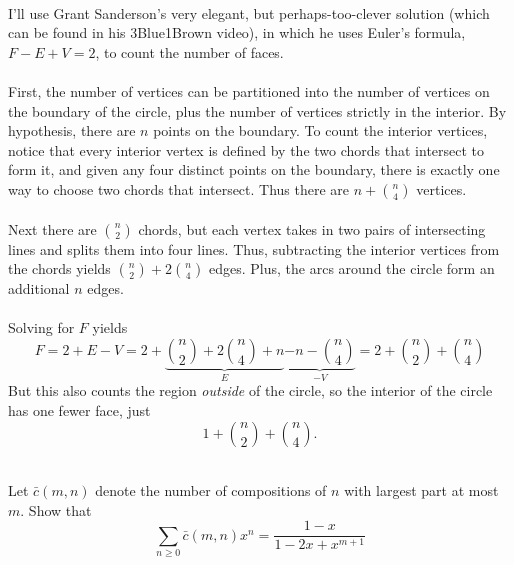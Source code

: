 \documentclass{article}
\newenvironment{problem}[2][Problem]{\begin{trivlist}
\item[\hskip \labelsep {\bfseries #1}\hskip \labelsep {\bfseries #2.}]}{\end{trivlist}}
\newenvironment{solution}[1][Solution.]{\begin{trivlist}
\item[\hskip \labelsep {\bfseries #1}]}{\end{trivlist}}
\begin{document}
\begin{solution} \text{} \\
  I'll use Grant Sanderson's very elegant, but perhaps-too-clever solution
  (which can be found in his 3Blue1Brown video), in which he uses Euler's
  formula, $F - E + V = 2$, to count the number of faces.
  \\~\\
  First, the number of vertices can be partitioned into the number of vertices
  on the boundary of the circle, plus the number of vertices strictly in the
  interior. By hypothesis, there are $n$ points on the boundary. To count the
  interior vertices, notice that every interior vertex is defined by the two
  chords that intersect to form it, and given any four distinct points on the
  boundary, there is exactly one way to choose two chords that intersect.
  Thus there are $n + \binom n 4$ vertices.
  \\~\\
  Next there are $\binom n 2$ chords, but each vertex takes in two pairs of
  intersecting lines and splits them into four lines. Thus, subtracting the
  interior vertices from the chords yields $\binom n 2 + 2\binom n 4$ edges.
  Plus, the arcs around the circle form an additional $n$ edges.
  \\~\\
  Solving for $F$ yields \[
    F = 2 + E - V
    = 2 + \underbrace{\binom n 2 + 2\binom n 4 + n}_E \underbrace{- n - \binom n 4}_{-V}
    = 2 + \binom n 2 + \binom n 4
  \]
  But this also counts the region \textit{outside} of the circle, so the
  interior of the circle has one fewer face, just \[
    1 + \binom n 2 + \binom n 4.
  \]
\end{solution}
\pagebreak
\begin{problem}{26} \text{} \\
  Let $\bar{c}(m,n)$ denote the number of compositions of $n$ with largest part
  at most $m$. Show that \[
    \sum_{n \geq 0}\bar c(m,n)x^n = \frac{1-x}{1-2x+x^{m+1}}
  \]
\end{problem}
\end{document}
